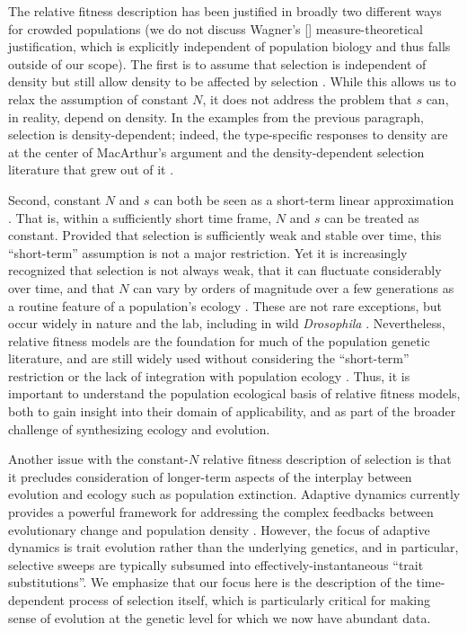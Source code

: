 \documentclass[11pt]{article}
\begin{document}
The relative fitness description has been justified in broadly two different ways for crowded populations (we do not discuss Wagner's [\citeyear{wagner_2010}] measure-theoretical justification, which is explicitly independent of population biology and thus falls outside of our scope). The first is to assume that selection is independent of density but still allow density to be affected by selection \citep[pp. 468]{barton_2007} \citep{prout_1980}. While this  allows us to relax the assumption of constant $N$, it does not address the problem that $s$  can, in reality, depend on density. In the examples from the previous paragraph, selection is density-dependent; indeed, the type-specific responses to density are at the center of MacArthur's argument and the density-dependent selection literature that grew out of it \citep{roughgarden_1979}. 

Second, constant $N$ and $s$ can both be seen as a short-term linear approximation \cite[pp. 277]{ewens_2004}. That is, within a sufficiently short time frame, $N$ and $s$ can be treated as constant. Provided that selection is sufficiently weak and stable over time, this ``short-term''  assumption is not a major restriction. Yet it is increasingly recognized that selection is not always weak, that it can fluctuate considerably over time, and that $N$ can vary by orders of magnitude over a few generations as a routine feature of a population's ecology \citep{messer_2016}. These are not rare exceptions, but occur widely in nature and the lab, including in wild \textit{Drosophila} \citep{bergland_14}. Nevertheless, relative fitness models are the foundation for much of the population genetic literature, and are still widely used without considering the ``short-term'' restriction or the lack of integration with population ecology \citep{mallet_2012}. Thus, it is important to understand the population ecological basis of relative fitness models, both to gain insight into their domain of applicability, and as part of the broader challenge of synthesizing ecology and evolution.

Another issue with the constant-$N$ relative fitness description of selection is that it precludes consideration of longer-term aspects of the interplay between evolution and ecology such as population extinction. Adaptive dynamics currently provides a powerful framework for addressing the complex feedbacks between evolutionary change and population density \citep{diekmann_2004}. However, the focus of adaptive dynamics is trait evolution rather than the underlying genetics, and in particular, selective sweeps are typically subsumed into effectively-instantaneous ``trait substitutions''. We emphasize that our focus here is the description of the time-dependent process of selection itself, which is particularly critical for making sense of evolution at the genetic level for which we now have abundant data.
\end{document}
